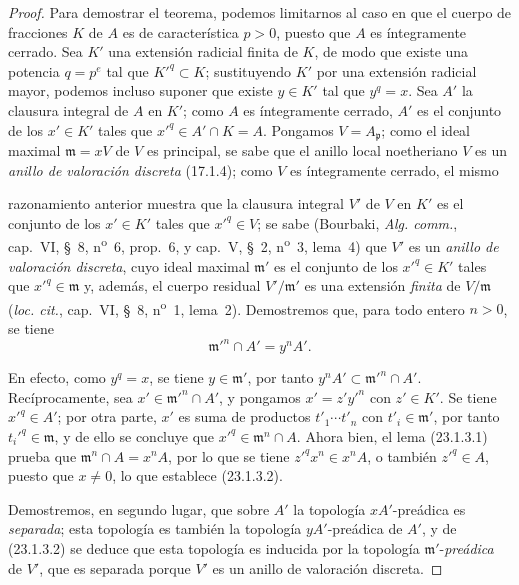 \begin{proof}
Para demostrar el teorema, podemos limitarnos al caso en que el cuerpo de fracciones
$K$ de $A$ es de característica $p>0$, puesto que $A$ es íntegramente cerrado.
Sea $K'$ una extensión radicial finita de $K$, de modo que existe una
potencia $q=p^e$ tal que $K'^q\subset K$; sustituyendo $K'$ por una
extensión radicial mayor, podemos incluso suponer que existe $y\in K'$ tal
que $y^q=x$. Sea $A'$ la clausura integral de $A$ en $K'$; como
$A$ es íntegramente cerrado, $A'$ es el conjunto de los $x'\in K'$ tales que
$x'^q\in A'\cap K=A$. Pongamos $V=A_{\mathfrak p}$; como el ideal maximal
$\mathfrak m=xV$ de $V$ es principal, se sabe que el anillo local
noetheriano $V$ es un \emph{anillo de valoración discreta} (17.1.4); como
$V$ es íntegramente cerrado, el mismo


razonamiento anterior muestra que la clausura integral $V'$ de $V$ en
$K'$ es el conjunto de los $x'\in K'$ tales que $x'^q\in V$; se sabe
(Bourbaki, \emph{Alg. comm.}, cap.~VI, §~8, n\textsuperscript{o}~6,
prop.~6, y cap.~V, §~2, n\textsuperscript{o}~3, lema~4) que $V'$ es un
\emph{anillo de valoración discreta}, cuyo ideal maximal $\mathfrak m'$ es
el conjunto de los $x'^q\in K'$ tales que $x'^q\in\mathfrak m$ y, además, el cuerpo
residual $V'/\mathfrak m'$ es una extensión \emph{finita} de
$V/\mathfrak m$ (\emph{loc. cit.}, cap.~VI, §~8,
n\textsuperscript{o}~1, lema~2). Demostremos que, para todo entero $n>0$, se tiene
\begin{equation}
\label{0.23.1.3.2-es}
  \mathfrak m'^n\cap A'=y^nA'.
  \tag{23.1.3.2}
\end{equation}

En efecto, como $y^q=x$, se tiene $y\in\mathfrak m'$, por tanto
$y^nA'\subset\mathfrak m'^n\cap A'$. Recíprocamente, sea
$x'\in\mathfrak m'^n\cap A'$, y pongamos $x'=z'y'^n$ con $z'\in K'$. Se tiene
$x'^q\in A'$; por otra parte, $x'$ es suma de productos
$t'_1\cdots t'_n$ con $t'_i\in\mathfrak m'$, por tanto
$t_i'^q\in\mathfrak m$, y de ello se concluye que
$x'^q\in\mathfrak m^n\cap A$. Ahora bien, el lema (23.1.3.1) prueba que
$\mathfrak m^n\cap A=x^nA$, por lo que se tiene $z'^qx^n\in x^nA$, o también
$z'^q\in A$, puesto que $x\neq0$, lo que establece (23.1.3.2).

Demostremos, en segundo lugar, que sobre $A'$ la topología $xA'$-preádica es
\emph{separada}; esta topología es también la topología $yA'$-preádica de
$A'$, y de (23.1.3.2) se deduce que esta topología es inducida por la
topología $\mathfrak m'$-\emph{preádica} de $V'$, que es separada porque $V'$ es
un anillo de valoración discreta.


\end{proof}
